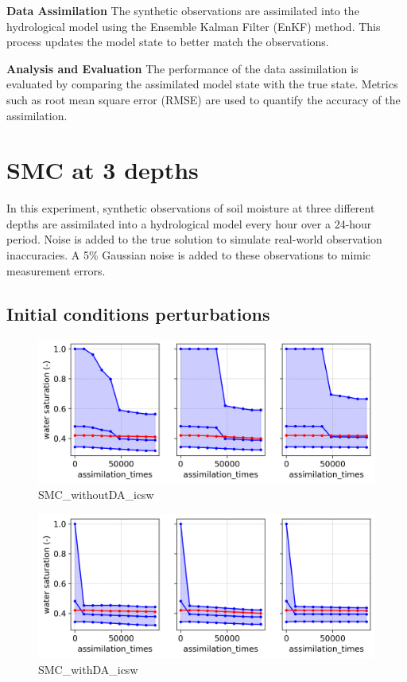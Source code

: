 \documentclass{article}
\begin{document}
\textbf{Data Assimilation}
The synthetic observations are assimilated into the hydrological model using the Ensemble Kalman Filter (EnKF) method. This process updates the model state to better match the observations.

\textbf{Analysis and Evaluation}
The performance of the data assimilation is evaluated by comparing the assimilated model state with the true state. Metrics such as root mean square error (RMSE) are used to quantify the accuracy of the assimilation.

\section{SMC at 3 depths}

In this experiment, synthetic observations of soil moisture at three different depths are assimilated into a hydrological model every hour over a 24-hour period. Noise is added to the true solution to simulate real-world observation inaccuracies. A 5\% Gaussian noise is added to these observations to mimic measurement errors.

\subsection{Initial conditions perturbations}

\begin{figure}[!htbp]
\centering
\includegraphics[width=0.75\linewidth]{files/SMC_withoutDA_ic_sw-80a4d7cd7a646d6d44550de4ab607d6f.png}
\caption[]{SMC\_withoutDA\_icsw}
\label{SMC_withoutDA_icsw}
\end{figure}

\begin{figure}[!htbp]
\centering
\includegraphics[width=0.75\linewidth]{files/SMC_withDA_ic_sw-4b08039f0ddf005f34bc3929ec4fefeb.png}
\caption[]{SMC\_withDA\_icsw}
\label{SMC_withoutDA_icsw}
\end{figure}
\end{document}
